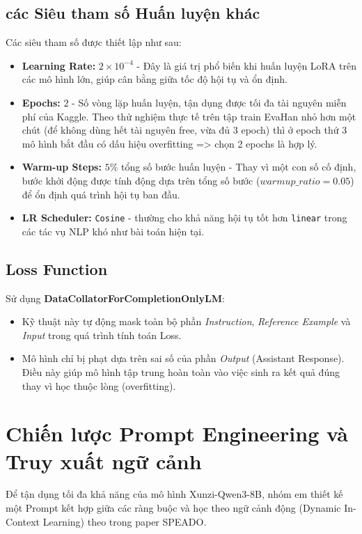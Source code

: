 \subsection{các Siêu tham số Huấn luyện khác}
Các siêu tham số được thiết lập như sau:

\begin{itemize}
    [cite_start]\item \textbf{Learning Rate:} $2 \times 10^{-4}$ - Đây là giá trị phổ biến khi huấn luyện LoRA trên các mô hình lớn, giúp cân bằng giữa tốc độ hội tụ và ổn định.
    \item \textbf{Epochs:} $2$ - Số vòng lặp huấn luyện, tận dụng được tối đa tài nguyên miễn phí của Kaggle. Theo thử nghiệm thực tế trên tập train EvaHan nhỏ hơn một chút (để không dùng hết tài nguyên free, vừa đủ 3 epoch) thì ở epoch thứ 3 mô hình bắt đầu có dấu hiệu overfitting => chọn 2 epochs là hợp lý.
    \item \textbf{Warm-up Steps:} $5\%$ tổng số bước huấn luyện - Thay vì một con số cố định, bước khởi động được tính động dựa trên tổng số bước ($warmup\_ratio = 0.05$) để ổn định quá trình hội tụ ban đầu.
    \item \textbf{LR Scheduler:} \texttt{Cosine} - thường cho khả năng hội tụ tốt hơn \texttt{linear} trong các tác vụ NLP khó như bài toán hiện tại.
\end{itemize}

\subsection{Loss Function}
Sử dụng \textbf{DataCollatorForCompletionOnlyLM}:
\begin{itemize}
    \item Kỹ thuật này tự động mask toàn bộ phần \textit{Instruction}, \textit{Reference Example} và \textit{Input} trong quá trình tính toán Loss.
    \item Mô hình chỉ bị phạt dựa trên sai số của phần \textit{Output} (Assistant Response). Điều này giúp mô hình tập trung hoàn toàn vào việc sinh ra kết quả đúng thay vì học thuộc lòng (overfitting).
\end{itemize}


\section{Chiến lược Prompt Engineering và Truy xuất ngữ cảnh}

Để tận dụng tối đa khả năng của mô hình Xunzi-Qwen3-8B, nhóm em thiết kế một Prompt kết hợp giữa các ràng buộc và học theo ngữ cảnh động (Dynamic In-Context Learning) theo trong paper SPEADO.

